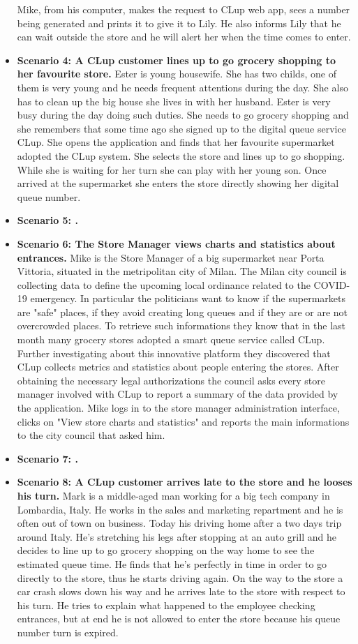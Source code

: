 \begin{itemize}
    Mike, from his computer, makes the request to CLup web app, sees a number being generated and prints it to give it to Lily. He also informs Lily that he can wait outside the store and he will alert her when the time comes to enter.
    \item \textbf{Scenario 4: A CLup customer lines up to go grocery shopping to her favourite store.} Ester is young housewife. She has two childs, one of them is very young and he needs frequent attentions during the day. She also has to clean up the big house she lives in with her husband. Ester is very busy during the day doing such duties. She needs to go grocery shopping and she remembers that some time ago she signed up to the digital queue service CLup. She opens the application and finds that her favourite supermarket adopted the CLup system. 
    She selects the store and lines up to go shopping. While she is waiting for her turn she can play with her young son. Once arrived at the supermarket she enters the store directly showing her digital queue number.
    \item \textbf{Scenario 5: .}
    \item \textbf{Scenario 6: The Store Manager views charts and statistics about entrances.} Mike is the Store Manager of a big supermarket near Porta Vittoria, situated in the metripolitan city of Milan. The Milan city council is collecting data to define the upcoming local ordinance related to the COVID-19 emergency. In particular the politicians want to know if the supermarkets are "safe" places, if they avoid creating long queues and if they are or are not overcrowded places. 
    To retrieve such informations they know that in the last month many grocery stores adopted a smart queue service called CLup. Further investigating about this innovative platform they discovered that CLup collects metrics and statistics about people entering the stores. After obtaining the necessary legal authorizations the council asks every store manager involved with CLup to report a summary of the data provided by the application. Mike logs in to the store manager administration interface, clicks on "View store charts and statistics" and reports the main informations to the city council that asked him.
    \item \textbf{Scenario 7: .}
    \item \textbf{Scenario 8: A CLup customer arrives late to the store and he looses his turn.} Mark is a middle-aged man working for a big tech company in Lombardia, Italy. He works in the sales and marketing repartment and he is often out of town on business. Today his driving home after a two days trip around Italy. He's stretching his legs after stopping at an auto grill and he decides to line up to go grocery shopping on the way home to see the estimated queue time. He finds that he's perfectly in time in order to go directly to the store, thus he starts driving again. 
    On the way to the store a car crash slows down his way and he arrives late to the store with respect to his turn. He tries to explain what happened to the employee checking entrances, but at end he is not allowed to enter the store because his queue number turn is expired.
\end{itemize}

